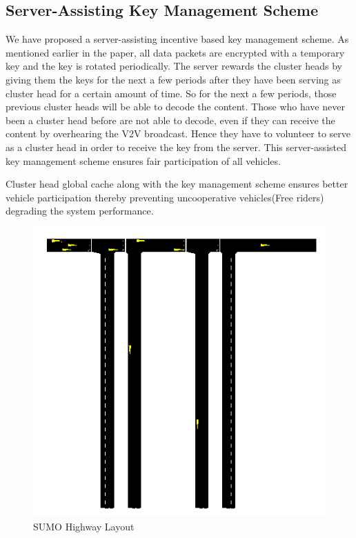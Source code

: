 \documentclass{acm_proc_article-sp}
\begin{document}
\subsection{Server-Assisting Key Management Scheme}
\vspace{1 mm}
We have proposed a server-assisting incentive based key management scheme. As mentioned earlier in the paper, all data packets are encrypted with a temporary key and the key is rotated periodically. The server rewards the cluster heads by giving them the keys for the next a few periods after they have been serving as cluster head for a certain amount of time. So for the next a few periods, those previous cluster heads will be able to decode the content. Those who have never been a cluster head before are not able to decode, even if they can receive the content by overhearing the V2V broadcast. Hence they have to volunteer to serve as a cluster head in order to receive the key from the server. This server-assisted key management scheme ensures fair participation of all vehicles.

Cluster head global cache along with the key management scheme ensures better vehicle participation thereby preventing uncooperative vehicles(Free riders) degrading the system performance. 

\begin{figure}
\centering
\includegraphics[scale=.40]{sumo.png} \caption{SUMO Highway Layout}
\label{sumo}
\end{figure}
\end{document}
